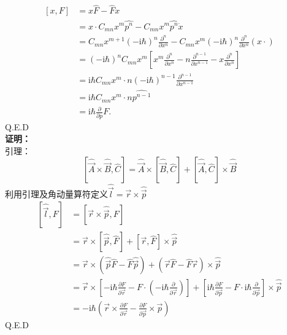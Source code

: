 \documentclass[a4paper]{article}
\begin{document}
\begin{CJK*}{UTF8}{song}
{    \begin{equation}
    \begin{split}
    [x,F]   & = x\hat{F} - \hat{F}x \\
            & = x\cdot C_{mn}x^{m}\hat{p^{n}} - C_{mn}x^{m}\hat{p^{n}}\dot x \\
            & = C_{mn}x^{m+1}(-\mathrm{i}\hbar)^{n}\frac{\partial^{n}}{\partial x^{n}}
                - C_{mn}x^{m}(-\mathrm{i}\hbar)^{n}\frac{\partial^{n}}{\partial x^{n}}(x\cdot)\\
            & = (-\mathrm{i}\hbar)^{n}C_{mn}x^{m}[x^{m}\frac{\partial^{n}}{\partial x^{n}}
                - n\frac{\partial^{n-1}}{\partial x^{n-1}}
                -x\frac{\partial^{n}}{\partial x^{n}}]\\
            & = \mathrm{i}\hbar C_{mn}x^{m}\cdot n(-\mathrm{i}\hbar)^{n-1}
                \frac{\partial^{n-1}}{\partial x^{n-1}}\\
            & = \mathrm{i}\hbar C_{mn}x^{m}\cdot n \hat{p^{n-1}}\\
            & = \mathrm{i}\hbar \frac{\partial}{\partial p}F.
    \end{split}
    \end{equation}
    Q.E.D
    }\\[20pt]
     \textbf{证明：}\\[12pt]
    {
    引理：
    $$[\hat{\vec{A}}\times\hat{\vec{B}},\hat{C}] 
        = \hat{\vec{A}}\times[\hat{\vec{B}},\hat{C}] + [\hat{\vec{A}},\hat{C}]\times\hat{\vec{B}}$$
    利用引理及角动量算符定义$\hat{\vec{l}} = \vec{r}\times\hat{\vec{p}}$
    \begin{equation}
    \begin{split}
    [\hat{\vec{l}},F]
        & = [\vec{r}\times\hat{\vec{p}},F]\\
        & = \vec{r}\times[\hat{\vec{p}},\hat{F}] + [\vec{r},\hat{F}]\times\hat{\vec{p}}\\
        & = \vec{r}\times(\hat{\vec{p}}\hat{F} - \hat{F}\hat{\vec{p}})
            +(\vec{r}\hat{F} - \hat{F}\vec{r})\times\hat{\vec{p}}\\
        & = \vec{r}\times[-\mathrm{i}\hbar\frac{\partial F}{\partial \vec{r}}
            -F\cdot(-\mathrm{i}\hbar\frac{\partial}{\partial \vec{r}})]
            +[\mathrm{i}\hbar\frac{\partial F}{\partial \vec{p}}
            -F\cdot\mathrm{i}\hbar\frac{\partial}{\partial \vec{p}}]\times\hat{\vec{p}}\\
        & = -\mathrm{i}\hbar(\vec{r}\times\frac{\partial F}{\partial \vec{r}} 
            - \frac{\partial F}{\partial \vec{p}}\times\vec{p})
    \end{split}
    \end{equation}
    Q.E.D
    }\\[20pt]
    \end{CJK*}
\end{document}
